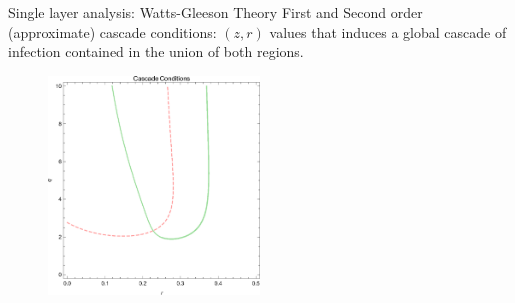 \documentclass[10pt, xcolor=dvipsnames, handout]{beamer}
\begin{document}
\begin{frame}{Single layer analysis: Watts-Gleeson Theory}
First and Second order (approximate) cascade conditions: $(z,r)$ values that induces a global cascade of infection contained in the union of both regions.
\begin{figure}
\centering
\includegraphics[width=0.5\textwidth]{figures/single_layer_cascade}
\end{figure}
\end{frame}
\end{document}
